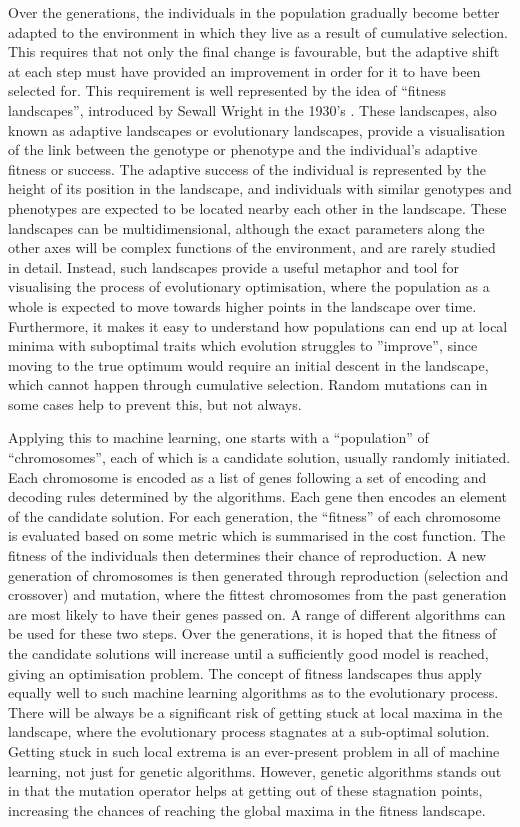 \documentclass[multicolumn, 9pt]{extarticle}
\begin{document}
Over the generations, the individuals in the population gradually become better adapted to the environment in which they live as a result of cumulative selection. This requires that not only the final change is favourable, but the adaptive shift at each step must have provided an improvement in order for it to have been selected for.  This requirement is well represented by the idea of ``fitness landscapes'', introduced by Sewall Wright in the 1930's \cite{Sewall}. These landscapes, also known as adaptive landscapes or evolutionary landscapes, provide a visualisation of the link between the genotype or phenotype and the individual's adaptive fitness or success. The adaptive success of the individual is represented by the height of its position in the landscape, and individuals with similar genotypes and phenotypes are expected to be located nearby each other in the landscape. These landscapes can be multidimensional, although the exact parameters along the other axes will be complex functions of the environment, and are rarely studied in detail. Instead, such landscapes provide a useful metaphor and tool for visualising the process of evolutionary optimisation, where the population as a whole is expected to move towards higher points in the landscape over time. Furthermore, it makes it easy to understand how populations can end up at local minima with suboptimal traits which evolution struggles to ''improve'', since moving to the true optimum would require an initial descent in the landscape, which cannot happen through cumulative selection. Random mutations can in some cases help to prevent this, but not always.

Applying this to machine learning, one starts with a ``population'' of ``chromosomes'', each of which is a candidate solution, usually randomly initiated. Each chromosome is encoded as a list of genes following a set of encoding and decoding rules determined by the algorithms. Each gene then encodes an element of the candidate solution. For each generation, the ``fitness'' of each chromosome is evaluated based on some metric which is summarised in the cost function. The fitness of the individuals then determines their chance of reproduction.
A new generation of chromosomes is then generated through reproduction (selection and crossover) and mutation, where the fittest chromosomes from the past generation are most likely to have their genes passed on. A range of different algorithms can be used for these two steps. Over the generations, it is hoped that the fitness of the candidate solutions will increase until a sufficiently good model is reached, giving an optimisation problem. The concept of fitness landscapes thus apply equally well to such machine learning algorithms as to the evolutionary process. There will be always be a significant risk of getting stuck at local maxima in the landscape, where the evolutionary process stagnates at a sub-optimal solution. Getting stuck in such local extrema is an ever-present problem in all of machine learning, not just for genetic algorithms. However, genetic algorithms stands out in that the mutation operator helps at getting out of these stagnation points, increasing the chances of reaching the global maxima in the fitness landscape.
\end{document}
